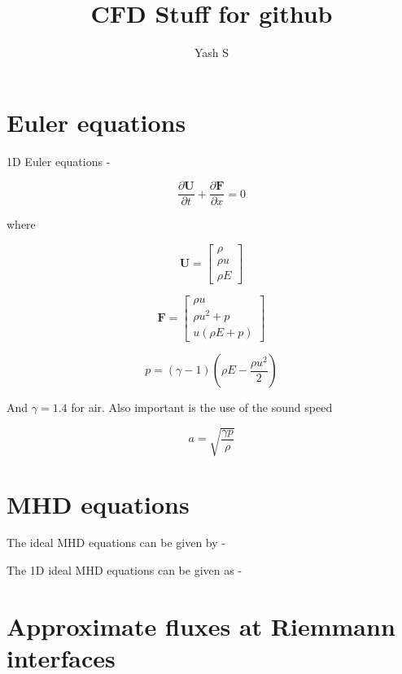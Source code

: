 \documentclass{article}
\title{CFD Stuff for github}
\author{Yash S}
\begin{document}
\maketitle

\section{Euler equations}

1D Euler equations -

\begin{equation}
    \frac{\partial \mathbf{U}}{\partial t} + \frac{\partial \mathbf{F}}{\partial x} = 0
    \label{1dconservelaw}
\end{equation}

where 

\begin{equation}
    \mathbf{U} = \left[ \begin{array}{c}
    \rho\\
    \rho u\\
    \rho E
    \end{array} \right] 
\end{equation}

\begin{equation}
    \mathbf{F} = \left[ \begin{array}{c}
    \rho u\\
    \rho u^2 + p\\
    u \left(\rho E + p\right)
    \end{array} \right] 
\end{equation}

\begin{equation}
    p = \left( \gamma - 1\right) \left( \rho E - \frac{\rho u^2}{2}\right)
\end{equation}

And $\gamma=1.4$ for air. Also important is the use of the sound speed

\begin{equation}
    a = \sqrt{\frac{\gamma p}{\rho}}
\end{equation}

\section{MHD equations}

The ideal MHD equations can be given by - 

The 1D ideal MHD equations can be given as - 

\section{Approximate fluxes at Riemmann interfaces}
\end{document}
